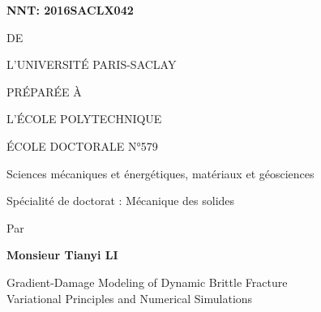 
\begin{titlepage}

\begin{flushleft}
 \hfill
{}
\end{flushleft}
\vspace{10pt}

\begin{mdframed}
\begin{minipage}[t][22cm][t]{\textwidth}
\begin{flushleft}
\large\textbf{NNT: 2016SACLX042}
\end{flushleft}
\vspace{20pt}

\begin{center}
{\color{color02}{\LARGE THÈSE DE DOCTORAT}

\vspace{8pt}
{\LARGE DE}

\vspace{8pt}
{\LARGE L'UNIVERSITÉ PARIS-SACLAY}

\vspace{8pt}
{\LARGE PRÉPARÉE À}

\vspace{8pt}
{\LARGE L'ÉCOLE POLYTECHNIQUE}}

\vspace{48pt}
{\Large ÉCOLE DOCTORALE N°579}

\vspace{5pt}
{\Large Sciences mécaniques et énergétiques, matériaux et géosciences}

\vspace{16pt}
{\Large Spécialité de doctorat : Mécanique des solides}
\vspace{12pt}

{\large Par}
\vspace{12pt}

{\LARGE\bfseries Monsieur Tianyi LI}
\vspace{48pt}

{\LARGE \sffamily
Gradient-Damage Modeling of Dynamic Brittle Fracture \\ \vspace{0.2cm}
Variational Principles and Numerical Simulations}
\end{center}


\end{minipage}
\end{mdframed}
\end{titlepage}
